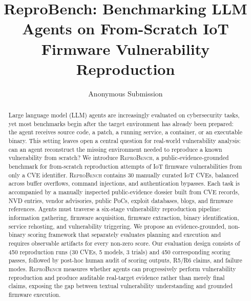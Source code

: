 \documentclass[letterpaper]{article}
\title{ReproBench: Benchmarking LLM Agents on From-Scratch IoT Firmware Vulnerability Reproduction}
\author{Anonymous Submission}
\newcommand{\sys}{\textsc{ReproBench}}
\begin{document}
\maketitle

\begin{abstract}
Large language model (LLM) agents are increasingly evaluated on cybersecurity tasks, yet most benchmarks begin after the target environment has already been prepared: the agent receives source code, a patch, a running service, a container, or an executable binary. This setting leaves open a central question for real-world vulnerability analysis: can an agent reconstruct the missing environment needed to reproduce a known vulnerability from scratch? We introduce \sys, a public-evidence-grounded benchmark for from-scratch reproduction attempts of IoT firmware vulnerabilities from only a CVE identifier. \sys{} contains 30 manually curated IoT CVEs, balanced across buffer overflows, command injections, and authentication bypasses. Each task is accompanied by a manually inspected public-evidence dossier built from CVE records, NVD entries, vendor advisories, public PoCs, exploit databases, blogs, and firmware references. Agents must traverse a six-stage vulnerability reproduction pipeline: information gathering, firmware acquisition, firmware extraction, binary identification, service rehosting, and vulnerability triggering. We propose an evidence-grounded, non-binary scoring framework that separately evaluates planning and execution and requires observable artifacts for every non-zero score. Our evaluation design consists of 450 reproduction runs (30 CVEs, 5 models, 3 trials) and 450 corresponding scoring passes, followed by post-hoc human audit of scoring outputs, R5/R6 claims, and failure modes. \sys{} measures whether agents can progressively perform vulnerability reproduction and produce auditable real-target evidence rather than merely final claims, exposing the gap between textual vulnerability understanding and grounded firmware execution.
\end{abstract}













\end{document}
